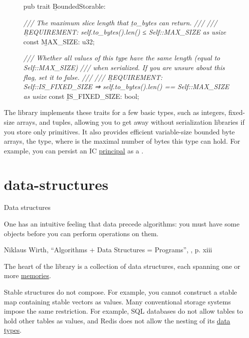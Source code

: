 \documentclass{article}
\begin{document}
\begin{figure}
\begin{code}[rust]
pub trait \label{bounded-storable-trait}\b{BoundedStorable}: \href{#storable-trait}{} {
    \emph{/// The maximum slice length that \b{to_bytes} can return.}
    \emph{///}
    \emph{/// \b{REQUIREMENT}: self.to_bytes().len() ≤ Self::MAX_SIZE as usize}
    const \b{MAX_SIZE}: u32;\label{max-size-attribute}

    \emph{/// Whether all values of this type have the same length (equal to Self::MAX_SIZE)}
    \emph{/// when serialized. If you are unsure about this flag, set it to \b{false}.}
    \emph{///}
    \emph{/// \b{REQUIREMENT}: Self::IS_FIXED_SIZE ⇒ self.to_bytes().len() == Self::MAX_SIZE as usize}
    const \b{IS_FIXED_SIZE}: bool;\label{is-fixed-size-attribute}
}
\end{code}
\end{figure}

The library implements these traits for a few basic types, such as integers, fixed-size arrays, and tuples, allowing you to get away without serialization libraries if you store only primitives.
It also provides efficient variable-size bounded byte arrays, the  type, where  is the maximal number of bytes this type can hold.
For example, you can persist an IC \href{https://internetcomputer.org/docs/current/references/ic-interface-spec#principal}{principal} as a .

\section{data-structures}{Data structures}
\epigraph{
    One has an intuitive feeling that data precede algorithms: you must have some objects before you can perform operations on them.
}{Niklaus Wirth, ``Algorithms + Data Structures = Programs'', , p. xiii}

The heart of the  library is a collection of data structures, each spanning one or more \href{#memory}{memories}.

Stable structures do not compose.
For example, you cannot construct a stable map containing stable vectors as values.
Many conventional storage systems impose the same restriction.
For example, SQL databases do not allow tables to hold other tables as values, and Redis does not allow the nesting of its \href{https://redis.io/docs/data-types/}{data types}.
\end{document}
